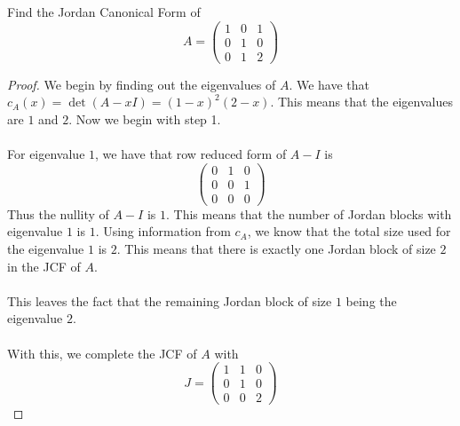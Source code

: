 \documentclass[a4paper]{article}
\begin{document}
\begin{eg}{}{} Find the Jordan Canonical Form of $$A=\begin{pmatrix}
1 & 0 & 1\\
0 & 1 & 0\\
0 & 1 & 2
\end{pmatrix}$$ \tcbline
\begin{proof}
We begin by finding out the eigenvalues of $A$. We have that $c_A(x)=\det(A-xI)=(1-x)^2(2-x)$. This means that the eigenvalues are $1$ and $2$. Now we begin with step 1. \\~\\
For eigenvalue $1$, we have that row reduced form of $A-I$ is $$\begin{pmatrix}
0 & 1 & 0\\
0 & 0 & 1\\
0 & 0 & 0
\end{pmatrix}$$
Thus the nullity of $A-I$ is $1$. This means that the number of Jordan blocks with eigenvalue $1$ is $1$. Using information from $c_A$, we know that the total size used for the eigenvalue $1$ is $2$. This means that there is exactly one Jordan block of size $2$ in the JCF of $A$. \\~\\
This leaves the fact that the remaining Jordan block of size $1$ being the eigenvalue $2$. \\~\\
With this, we complete the JCF of $A$ with $$J=\begin{pmatrix}
1 & 1 & 0\\
0 & 1 & 0\\
0 & 0 & 2
\end{pmatrix}$$


\end{proof}
\end{eg}
\end{document}
